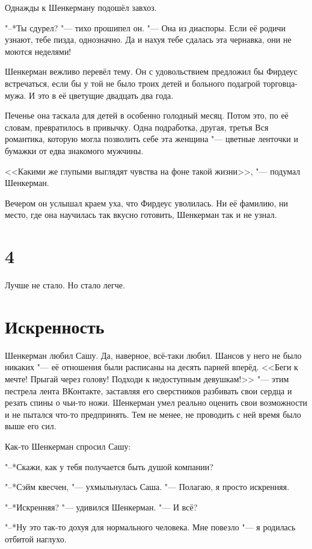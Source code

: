 Однажды к Шенкерману подошёл завхоз.

"--*Ты сдурел? "--- тихо прошипел он.
"--- Она из диаспоры.
Если её родичи узнают, тебе пизда, однозначно.
Да и нахуя тебе сдалась эта чернавка, они не моются неделями!

Шенкерман вежливо перевёл тему.
Он с удовольствием предложил бы Фирдеус встречаться, если бы у той не было троих детей и больного подагрой торговца-мужа.
И это в её цветущие двадцать два года.

Печенье она таскала для детей в особенно голодный месяц.
Потом это, по её словам, превратилось в привычку.
Одна подработка, другая, третья\ldotst
Вся романтика, которую могла позволить себе эта женщина "--- цветные ленточки и бумажки от едва знакомого мужчины.

<<Какими же глупыми выглядят чувства на фоне такой жизни>>, "--- подумал Шенкерман.

Вечером он услышал краем уха, что Фирдеус уволилась.
Ни её фамилию, ни место, где она научилась так вкусно готовить, Шенкерман так и не узнал.

\section{4}

Лучше не стало.
Но стало легче.

\section{Искренность}

Шенкерман любил Сашу.
Да, наверное, всё-таки любил.
Шансов у него не было никаких "--- её отношения были расписаны на десять парней вперёд.
<<Беги к мечте!
Прыгай через голову!
Подходи к недоступным девушкам!>> "--- этим пестрела лента ВКонтакте, заставляя его сверстников разбивать свои сердца и резать спины о чьи-то ножи.
Шенкерман умел реально оценить свои возможности и не пытался что-то предпринять.
Тем не менее, не проводить с ней время было выше его сил.

Как-то Шенкерман спросил Сашу:

"--*Скажи, как у тебя получается быть душой компании?

"--*Сэйм квесчен, "--- ухмыльнулась Саша.
"--- Полагаю, я просто искренняя.

"--*Искренняя? "--- удивился Шенкерман.
"--- И всё?

"--*Ну это так-то дохуя для нормального человека.
Мне повезло "--- я родилась отбитой наглухо.

